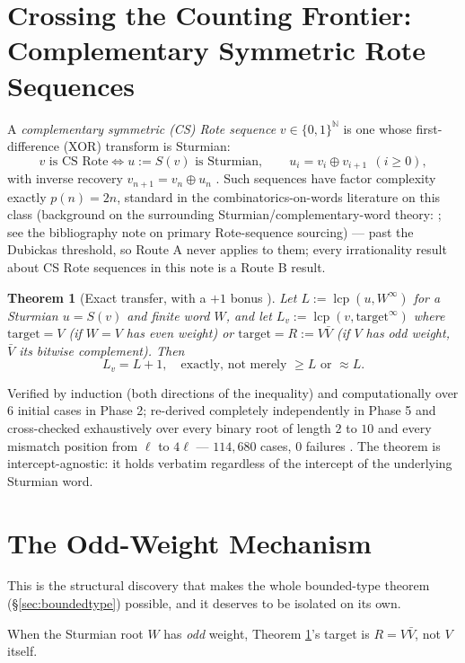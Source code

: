 \documentclass[11pt]{article}
\newtheorem{theorem}{Theorem}[section]
\newcommand{\N}{\mathbb{N}}
\begin{document}
\section{Crossing the Counting Frontier: Complementary Symmetric Rote Sequences}
\label{sec:rote}

A \emph{complementary symmetric (CS) Rote sequence} $v\in\{0,1\}^\N$ is one whose first-difference (XOR) transform is Sturmian:
\[
v \text{ is CS Rote} \iff u:=S(v) \text{ is Sturmian}, \qquad u_i = v_i\oplus v_{i+1}\ \ (i\ge0),
\]
with inverse recovery $v_{n+1}=v_n\oplus u_n$ \cite{Phase2Transfer}. Such sequences have factor complexity exactly $p(n)=2n$, standard in the combinatorics-on-words literature on this class (background on the surrounding Sturmian/complementary-word theory: \cite{Lothaire2002}; see the bibliography note on primary Rote-sequence sourcing) --- past the Dubickas threshold, so Route A never applies to them; every irrationality result about CS Rote sequences in this note is a Route B result.

\begin{theorem}[Exact transfer, with a $+1$ bonus \cite{Phase2Transfer}]
\label{thm:transfer}
Let $L:=\operatorname{lcp}(u,W^\infty)$ for a Sturmian $u=S(v)$ and finite word $W$, and let $L_v:=\operatorname{lcp}(v,\mathrm{target}^\infty)$ where $\mathrm{target}=V$ (if $W=V$ has even weight) or $\mathrm{target}=R:=V\bar V$ (if $V$ has odd weight, $\bar V$ its bitwise complement). Then
\[
L_v = L+1, \quad\text{exactly, not merely } \ge L \text{ or } \approx L.
\]
\end{theorem}
Verified by induction (both directions of the inequality) and computationally over $6$ initial cases in Phase 2; re-derived completely independently in Phase 5 and cross-checked exhaustively over every binary root of length $2$ to $10$ and every mismatch position from $\ell$ to $4\ell$ --- $114{,}680$ cases, $0$ failures \cite{Phase5Transfer}. The theorem is intercept-agnostic: it holds verbatim regardless of the intercept of the underlying Sturmian word.

\section{The Odd-Weight Mechanism}
\label{sec:oddweight}

This is the structural discovery that makes the whole bounded-type theorem (\S\ref{sec:boundedtype}) possible, and it deserves to be isolated on its own.

When the Sturmian root $W$ has \emph{odd} weight, Theorem \ref{thm:transfer}'s target is $R=V\bar V$, not $V$ itself.
\end{document}
